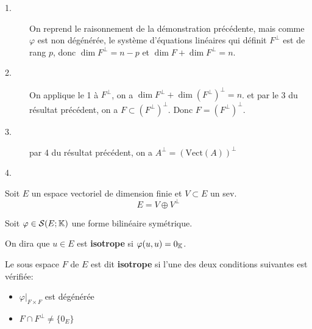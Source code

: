 \documentclass[a4paper, 12pt]{article}
\begin{document}
\begin{demonstration}
    \begin{description}
        \item[1.]
            On reprend le raisonnement de la démonstration précédente, mais comme $\varphi$ est non dégénérée, le système d'équations linéaires qui définit $F^\perp$ est de rang $p$,
            donc $\dim F^\perp = n - p$ et $\dim F + \dim F^\perp = n$.
        \item[2.]
        On applique le 1 à $F^\perp$, on a $\dim F^\perp + \dim (F^\perp)^\perp = n$.
        et par le 3 du résultat précédent, on a $F \subset (F^\perp)^\perp$.
        Donc $F = (F^\perp)^\perp$.
        
        \item[3.]
        par 4 du résultat précédent, on a $A^\perp = (\text{Vect}(A))^\perp$
        
        \item[4.]
    \end{description}
\end{demonstration}

\begin{corollaire}{}{}
    Soit $E$ un espace vectoriel de dimension finie et $V \subset E$ un sev.
    $$
    E = V \oplus V^\perp
    $$
\end{corollaire}

\begin{definition}[(Isotropie)]
    Soit $\varphi \in \mathcal{S}(E; \mathbb{K})$ une forme bilinéaire symétrique.
    
    On dira que $u \in E$ est \textbf{isotrope} si $\varphi(u, u) = 0_{\mathbb{K}}$.

    Le sous espace $F$ de $E$ est dit \textbf{isotrope} si l'une des deux conditions suivantes est vérifiée:
    \begin{itemize}
        \item $\varphi|_{F \times F}$ est dégénérée
        \item $F \cap F^\perp \neq \{0_E\}$
    \end{itemize}
\end{definition}
\end{document}
